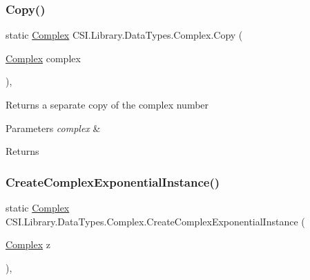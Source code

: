 \subsubsection{\texorpdfstring{Copy()}{Copy()}\hspace{0.1cm}{\footnotesize\ttfamily [2/2]}}
{\footnotesize\ttfamily static \mbox{\hyperlink{struct_c_s_i_1_1_library_1_1_data_types_1_1_complex}{Complex}} C\+S\+I.\+Library.\+Data\+Types.\+Complex.\+Copy (\begin{DoxyParamCaption}\item[{\mbox{\hyperlink{struct_c_s_i_1_1_library_1_1_data_types_1_1_complex}{Complex}}}]{complex }\end{DoxyParamCaption})\hspace{0.3cm}{\ttfamily [inline]}, {\ttfamily [static]}}



Returns a separate copy of the complex number 


\begin{DoxyParams}{Parameters}
{\em complex} & \\
\hline
\end{DoxyParams}
\begin{DoxyReturn}{Returns}

\end{DoxyReturn}
\mbox{\label{struct_c_s_i_1_1_library_1_1_data_types_1_1_complex_ae3596863bdda93658c3b4162d6ad0fd6}} 
\subsubsection{\texorpdfstring{CreateComplexExponentialInstance()}{CreateComplexExponentialInstance()}}
{\footnotesize\ttfamily static \mbox{\hyperlink{struct_c_s_i_1_1_library_1_1_data_types_1_1_complex}{Complex}} C\+S\+I.\+Library.\+Data\+Types.\+Complex.\+Create\+Complex\+Exponential\+Instance (\begin{DoxyParamCaption}\item[{\mbox{\hyperlink{struct_c_s_i_1_1_library_1_1_data_types_1_1_complex}{Complex}}}]{z }\end{DoxyParamCaption})\hspace{0.3cm}{\ttfamily [inline]}, {\ttfamily [static]}}



